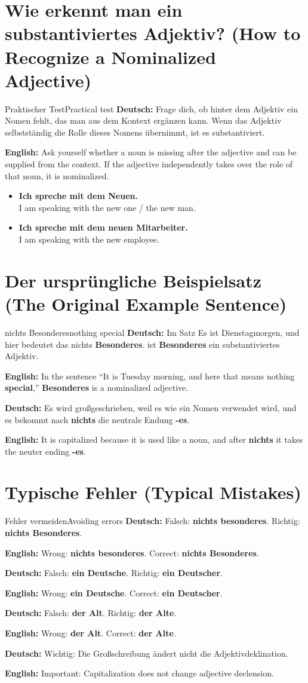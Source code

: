 \documentclass[a4paper,11pt]{article}
\newcommand{\GermanText}[1]{\textbf{Deutsch: }#1\par}
\newcommand{\EnglishText}[1]{{\small\color{SoftGray}\textbf{English: }#1\par}}
\newcommand{\ExampleItem}[2]{\item \textbf{#1}\\{\small\color{SoftGray}#2}}
\begin{document}
\section{Wie erkennt man ein substantiviertes Adjektiv? \textnormal{(How to Recognize a Nominalized Adjective)}}
\begin{grammarentry}{Praktischer Test}{Practical test}
\GermanText{Frage dich, ob hinter dem Adjektiv ein Nomen fehlt, das man aus dem Kontext ergänzen kann. Wenn das Adjektiv selbstständig die Rolle dieses Nomens übernimmt, ist es substantiviert.}
\EnglishText{Ask yourself whether a noun is missing after the adjective and can be supplied from the context. If the adjective independently takes over the role of that noun, it is nominalized.}
\end{grammarentry}
\begin{exbox}
\begin{itemize}
\ExampleItem{Ich spreche mit dem \textbf{Neuen}.}{I am speaking with the new one / the new man.}
\ExampleItem{Ich spreche mit dem \textbf{neuen Mitarbeiter}.}{I am speaking with the new employee.}
\end{itemize}
\end{exbox}

\section{Der ursprüngliche Beispielsatz \textnormal{(The Original Example Sentence)}}
\begin{grammarentry}{nichts Besonderes}{nothing special}
\GermanText{Im Satz \glqq Es ist Dienstagmorgen, und hier bedeutet das nichts \textbf{Besonderes}.\grqq{} ist \textbf{Besonderes} ein substantiviertes Adjektiv.}
\EnglishText{In the sentence ``It is Tuesday morning, and here that means nothing \textbf{special},'' \textbf{Besonderes} is a nominalized adjective.}
\GermanText{Es wird großgeschrieben, weil es wie ein Nomen verwendet wird, und es bekommt nach \textbf{nichts} die neutrale Endung \textbf{-es}.}
\EnglishText{It is capitalized because it is used like a noun, and after \textbf{nichts} it takes the neuter ending \textbf{-es}.}
\end{grammarentry}

\section{Typische Fehler \textnormal{(Typical Mistakes)}}
\begin{grammarentry}{Fehler vermeiden}{Avoiding errors}
\GermanText{Falsch: \textbf{nichts besonderes}. Richtig: \textbf{nichts Besonderes}.}
\EnglishText{Wrong: \textbf{nichts besonderes}. Correct: \textbf{nichts Besonderes}.}
\GermanText{Falsch: \textbf{ein Deutsche}. Richtig: \textbf{ein Deutscher}.}
\EnglishText{Wrong: \textbf{ein Deutsche}. Correct: \textbf{ein Deutscher}.}
\GermanText{Falsch: \textbf{der Alt}. Richtig: \textbf{der Alte}.}
\EnglishText{Wrong: \textbf{der Alt}. Correct: \textbf{der Alte}.}
\GermanText{Wichtig: Die Großschreibung ändert nicht die Adjektivdeklination.}
\EnglishText{Important: Capitalization does not change adjective declension.}
\end{grammarentry}
\end{document}
